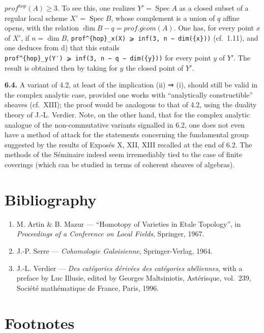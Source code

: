 \documentclass[
  11pt,
  a4paper,
]{book}
\providecommand{\tightlist}{%
  \setlength{\itemsep}{0pt}\setlength{\parskip}{0pt}}
\begin{document}
\(prof^{hop}(A) \geqslant 3\). To see this, one realizes
\(Y' = \operatorname{Spec} A\) as a closed subset of a regular local
scheme \(X' = \operatorname{Spec} B\), whose complement is a union of
\(q\) affine opens, with the relation \(\dim B -
q = prof.g\acute{e}om(A)\). One has, for every point \(x\) of \(X'\), if
\(n = \dim B\),
\texttt{prof\^{}\{hop\}\_x(X)\ ⩾\ inf(3,\ n\ −\ dim(\{x\}))} (cf.~1.11),
and one deduces from d) that this entails
\texttt{prof\^{}\{hop\}\_y(Y′)\ ⩾\ inf(3,\ n\ −\ q\ −\ dim(\{y\}))} for
every point \(y\) of \(Y'\). The result is obtained then by taking for
\(y\) the closed point of \(Y'\).

\textbf{6.4.} A variant of 4.2, at least of the implication (ii) ⇒ (i),
should still be valid in the complex analytic case, provided one works
with ``analytically constructible'' sheaves (cf.~XIII); the proof would
be analogous to that of 4.2, using the duality theory of J.-L. Verdier.
Note, on the other hand, that for the complex analytic analogue of the
non-commutative variants signalled in 6.2, one does not even have a
method of attack for the statements concerning the fundamental group
suggested by the results of Exposés X, XII, XIII recalled at the end of
6.2. The methods of the Séminaire indeed seem irremediably tied to the
case of finite coverings (which can be studied in terms of coherent
sheaves of algebras).

\section{Bibliography}\label{bibliography-4}

\begin{enumerate}
\def\labelenumi{\arabic{enumi}.}
\tightlist
\item
  M. Artin \& B. Mazur --- ``Homotopy of Varieties in Etale Topology'',
  in \emph{Proceedings of a Conference on Local Fields}, Springer, 1967.
\item
  J.-P. Serre --- \emph{Cohomologie Galoisienne}, Springer-Verlag, 1964.
\item
  J.-L. Verdier --- \emph{Des catégories dérivées des catégories
  abéliennes}, with a preface by Luc Illusie, edited by Georges
  Maltsiniotis, Astérisque, vol.~239, Société mathématique de France,
  Paris, 1996.
\end{enumerate}

\section{Footnotes}\label{footnotes-2}
\end{document}
